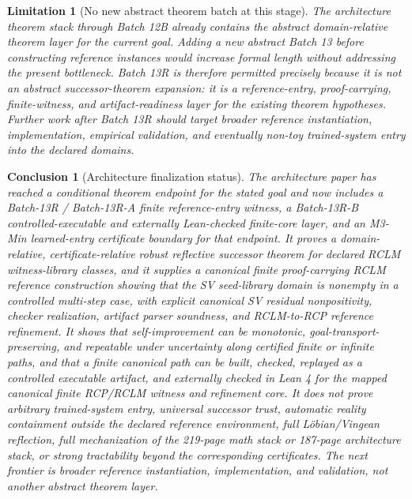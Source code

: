 \documentclass[11pt,a4paper]{article}
\newtheorem{limitation}[theorem]{Limitation}
\newtheorem{conclusion}[theorem]{Conclusion}
\begin{document}
\begin{limitation}[No new abstract theorem batch at this stage]
\label{lim:no-new-abstract-batch-13-yet}
The architecture theorem stack through Batch 12B already contains the abstract domain-relative theorem layer for the current goal.  Adding a new abstract Batch 13 before constructing reference instances would increase formal length without addressing the present bottleneck.  Batch 13R is therefore permitted precisely because it is not an abstract successor-theorem expansion: it is a reference-entry, proof-carrying, finite-witness, and artifact-readiness layer for the existing theorem hypotheses.  Further work after Batch 13R should target broader reference instantiation, implementation, empirical validation, and eventually non-toy trained-system entry into the declared domains.
\end{limitation}

\begin{conclusion}[Architecture finalization status]
The architecture paper has reached a conditional theorem endpoint for the stated goal and now includes a Batch-13R / Batch-13R-A finite reference-entry witness, a Batch-13R-B controlled-executable and externally Lean-checked finite-core layer, and an M3-Min learned-entry certificate boundary for that endpoint.  It proves a domain-relative, certificate-relative robust reflective successor theorem for declared RCLM witness-library classes, and it supplies a canonical finite proof-carrying RCLM reference construction showing that the SV seed-library domain is nonempty in a controlled multi-step case, with explicit canonical SV residual nonpositivity, checker realization, artifact parser soundness, and RCLM-to-RCP reference refinement.  It shows that self-improvement can be monotonic, goal-transport-preserving, and repeatable under uncertainty along certified finite or infinite paths, and that a finite canonical path can be built, checked, replayed as a controlled executable artifact, and externally checked in Lean 4 for the mapped canonical finite RCP/RCLM witness and refinement core.  It does not prove arbitrary trained-system entry, universal successor trust, automatic reality containment outside the declared reference environment, full L\"obian/Vingean reflection, full mechanization of the 219-page math stack or 187-page architecture stack, or strong tractability beyond the corresponding certificates.  The next frontier is broader reference instantiation, implementation, and validation, not another abstract theorem layer.
\end{conclusion}
\end{document}
